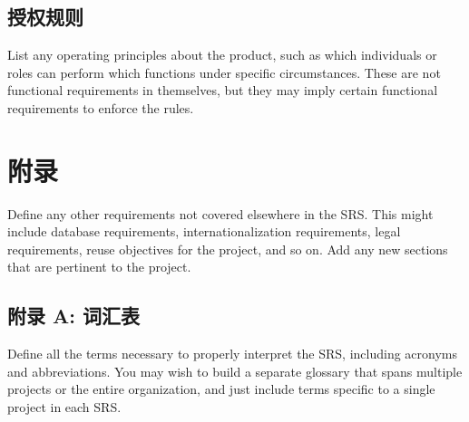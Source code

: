 \documentclass{ctexart}
\begin{document}
\subsection{授权规则}
List any operating principles about the product, such as which individuals or
roles can perform which functions under specific circumstances. These are not
functional requirements in themselves, but they may imply certain functional
requirements to enforce the rules.



\section{附录}\label{S:appendix}
Define any other requirements not covered elsewhere in the SRS. This might
include database requirements, internationalization requirements, legal
requirements, reuse objectives for the project, and so on. Add any new sections
that are pertinent to the project.
\subsection{附录 A: 词汇表}
Define all the terms necessary to properly interpret the SRS, including
acronyms and abbreviations. You may wish to build a separate glossary that spans
multiple projects or the entire organization, and just include terms specific to
a single project in each SRS.
\end{document}
